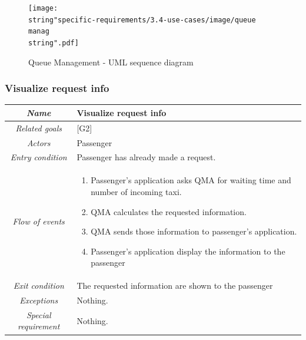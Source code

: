 \clearpage{}

\begin{figure}[H]
\begin{centering}
\texttt{[image: \\string"specific-requirements/3.4-use-cases/image/queue manag\\string".pdf]}
\par\end{centering}

\protect\caption{Queue Management - UML sequence diagram}
\end{figure}


\clearpage{}


\subsubsection{Visualize request info}

\begin{flushleft}
\begin{tabular}{c|>{\raggedright}p{10cm}}
\hline 
\emph{Name} & \raggedright{}Visualize request info\tabularnewline
\hline 
\emph{Related goals} & \raggedright{}{[}G2{]}\tabularnewline
\hline 
\emph{Actors} & \raggedright{}Passenger\tabularnewline
\hline 
\emph{Entry condition} & \raggedright{}Passenger has already made a request.\tabularnewline
\hline 
\emph{Flow of events} & \begin{enumerate}
\item \begin{raggedright}
Passenger's application asks QMA for waiting time and number of incoming
taxi.
\par\end{raggedright}
\item QMA calculates the requested information.
\item \begin{raggedright}
QMA sends those information to passenger's application.
\par\end{raggedright}
\item \raggedright{}Passenger's application display the information to the
passenger\end{enumerate}
\tabularnewline
\hline 
\emph{Exit condition} & \raggedright{}The requested information are shown to the passenger\tabularnewline
\hline 
\emph{Exceptions} & \raggedright{}Nothing.\tabularnewline
\hline 
\emph{Special requirement} & \raggedright{}Nothing.\tabularnewline
\hline 
\end{tabular}
\par\end{flushleft}

